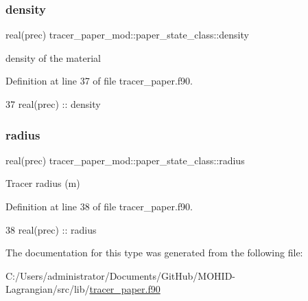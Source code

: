 \subsubsection{\texorpdfstring{density}{density}}
{\footnotesize\ttfamily real(prec) tracer\+\_\+paper\+\_\+mod\+::paper\+\_\+state\+\_\+class\+::density\hspace{0.3cm}{\ttfamily [private]}}



density of the material 



Definition at line 37 of file tracer\+\_\+paper.\+f90.


\begin{DoxyCode}
37         \textcolor{keywordtype}{real(prec)} :: density
\end{DoxyCode}
\mbox{\label{structtracer__paper__mod_1_1paper__state__class_ac70463dad7537b4e18c6719e975a2a80}} 
\subsubsection{\texorpdfstring{radius}{radius}}
{\footnotesize\ttfamily real(prec) tracer\+\_\+paper\+\_\+mod\+::paper\+\_\+state\+\_\+class\+::radius\hspace{0.3cm}{\ttfamily [private]}}



Tracer radius (m) 



Definition at line 38 of file tracer\+\_\+paper.\+f90.


\begin{DoxyCode}
38         \textcolor{keywordtype}{real(prec)} :: radius
\end{DoxyCode}


The documentation for this type was generated from the following file\+:\begin{DoxyCompactItemize}
\item 
C\+:/\+Users/administrator/\+Documents/\+Git\+Hub/\+M\+O\+H\+I\+D-\/\+Lagrangian/src/lib/\mbox{\hyperlink{tracer__paper_8f90}{tracer\+\_\+paper.\+f90}}\end{DoxyCompactItemize}
